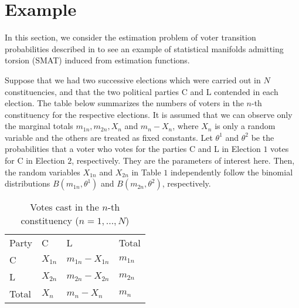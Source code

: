 \documentclass[graybox]{svmult}
\begin{document}
\section{Example}
\label{sec:6}
In this section, we consider the estimation problem of voter transition probabilities 
described in \cite{MN} to see an example of statistical manifolds admitting torsion (SMAT) 
induced from estimation functions.

Suppose that we had two successive elections which were carried out in $N$ constituencies,
and that the two political parties C and L contended in each election.
The table below summarizes the numbers of voters in the $n$-th constituency for the respective
elections. It is assumed that we can observe only the marginal totals $m_{1n}, m_{2n}, X_n$
and $m_n-X_n$, where $X_n$ is only a random variable and the others are treated as fixed 
constants.
Let $\theta^1$ and $\theta^2$ be the probabilities that a voter who votes for the parties
C and L in Election $1$ votes for C in Election $2$, respectively. They are the parameters
of interest here. Then, the random variables $X_{1n}$ and $X_{2n}$ in Table $1$ independently
follow the binomial distributions $B(m_{1n},\theta^1)$ and $B(m_{2n},\theta^2)$, respectively.

\begin{table}
\begin{center}
\caption{Votes cast in the $n$-th constituency ($n=1,\ldots,N$)}
\label{tab:1}
\begin{tabular}{p{2cm}p{2cm}p{2cm}p{0.6cm}}
Party & C & L & Total \\ 
\noalign{\smallskip}\hline\noalign{\smallskip}
C & $X_{1n}$ & $m_{1n}-X_{1n}$ & $m_{1n}$ \\
\noalign{\smallskip}\hline\noalign{\smallskip}
L & $X_{2n}$ & $m_{2n}-X_{2n}$ & $m_{2n}$ \\
\noalign{\smallskip}\hline\noalign{\smallskip}
Total & $X_n$ & $m_n-X_n$ & $m_n$ \\
\end{tabular}
\end{center}
\end{table}
\end{document}
